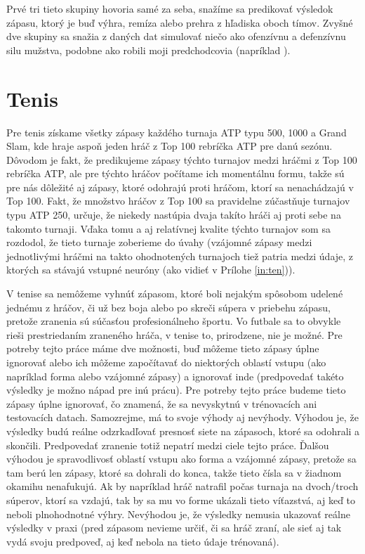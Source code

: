 Prvé tri tieto skupiny hovoria samé za seba, snažíme sa predikovať výsledok zápasu, ktorý je buď výhra, remíza alebo prehra z hľadiska oboch tímov. Zvyšné dve skupiny sa snažia z daných dat simulovať niečo ako ofenzívnu a defenzívnu silu mužstva, podobne ako robili moji predchodcovia (napríklad \citep{related:igiri}).

\section{Tenis} \label{ten}
Pre tenis získame všetky zápasy každého turnaja ATP typu 500, 1000 a Grand Slam, kde hraje aspoň jeden hráč z Top 100 rebríčka ATP pre danú sezónu.
Dôvodom je fakt, že predikujeme zápasy týchto turnajov medzi hráčmi z Top 100 rebríčka ATP, ale pre týchto hráčov počítame ich momentálnu formu, takže sú pre nás dôležité aj zápasy, ktoré odohrajú proti hráčom, ktorí sa nenachádzajú v Top 100.
Fakt, že množstvo hráčov z Top 100 sa pravidelne zúčastňuje turnajov typu ATP 250, určuje, že niekedy nastúpia dvaja takíto hráči aj proti sebe na takomto turnaji. Vďaka tomu a aj relatívnej kvalite týchto turnajov som sa rozdodol, že tieto turnaje zoberieme do úvahy (vzájomné zápasy medzi jednotlivými hráčmi na takto ohodnotených turnajoch tiež patria medzi údaje, z ktorých sa stávajú vstupné neuróny (ako vidieť v Prílohe \ref{in:ten})). 

V tenise sa nemôžeme vyhnúť zápasom, ktoré boli nejakým spôsobom udelené jednému z hráčov, či už bez boja alebo po skreči súpera v priebehu zápasu, pretože zranenia sú súčasťou profesionálneho športu.
Vo futbale sa to obvykle rieši prestriedaním zraneného hráča, v tenise to, prirodzene, nie je možné.
Pre potreby tejto práce máme dve možnosti, buď môžeme tieto zápasy úplne ignorovať alebo ich môžeme započítavať do niektorých oblastí vstupu (ako napríklad forma alebo vzájomné zápasy) a ignorovať inde (predpovedať takéto výsledky je možno nápad pre inú prácu). 
Pre potreby tejto práce budeme tieto zápasy úplne ignorovať, čo znamená, že sa nevyskytnú v trénovacích ani testovacích datach.
Samozrejme, má to svoje výhody aj nevýhody.
Výhodou je, že výsledky budú reálne odzrkadľovať presnosť siete na zápasoch, ktoré sa odohrali a skončili.
Predpovedať zranenie totiž nepatrí medzi ciele tejto práce.
Ďalšou výhodou je spravodlivosť oblastí vstupu ako forma a vzájomné zápasy, pretože sa tam berú len zápasy, ktoré sa dohrali do konca, takže tieto čísla sa v žiadnom okamihu nenafukujú. Ak by napríklad hráč natrafil počas turnaja na dvoch/troch súperov, ktorí sa vzdajú, tak by sa mu vo forme ukázali tieto víťazstvá, aj keď to neboli plnohodnotné výhry.
Nevýhodou je, že výsledky nemusia ukazovať reálne výsledky v praxi (pred zápasom nevieme určiť, či sa hráč zraní, ale sieť aj tak vydá svoju predpoveď, aj keď nebola na tieto údaje trénovaná).

